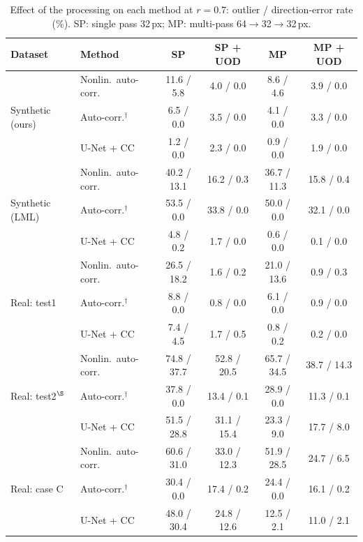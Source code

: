 \begin{table}[t]
\centering
\caption{Effect of the processing on each method at $r=0.7$: outlier / direction-error rate (\%). SP: single pass 32\,px; MP: multi-pass 64$\to$32$\to$32\,px.}
\label{tab:process}
\small
\begin{tabular}{llcccc}
\toprule
Dataset & Method & SP & SP + UOD & MP & MP + UOD \\
\midrule
\multirow{3}{*}{Synthetic (ours)} & Nonlin.\ auto-corr. & 11.6 / 5.8 & 4.0 / 0.0 & 8.6 / 4.6 & 3.9 / 0.0 \\
 & Auto-corr.$^\dagger$ & 6.5 / 0.0 & 3.5 / 0.0 & 4.1 / 0.0 & 3.3 / 0.0 \\
 & U-Net + CC & 1.2 / 0.0 & 2.3 / 0.0 & 0.9 / 0.0 & 1.9 / 0.0 \\
\midrule
\multirow{3}{*}{Synthetic (LML)} & Nonlin.\ auto-corr. & 40.2 / 13.1 & 16.2 / 0.3 & 36.7 / 11.3 & 15.8 / 0.4 \\
 & Auto-corr.$^\dagger$ & 53.5 / 0.0 & 33.8 / 0.0 & 50.0 / 0.0 & 32.1 / 0.0 \\
 & U-Net + CC & 4.8 / 0.2 & 1.7 / 0.0 & 0.6 / 0.0 & 0.1 / 0.0 \\
\midrule
\multirow{3}{*}{Real: test1} & Nonlin.\ auto-corr. & 26.5 / 18.2 & 1.6 / 0.2 & 21.0 / 13.6 & 0.9 / 0.3 \\
 & Auto-corr.$^\dagger$ & 8.8 / 0.0 & 0.8 / 0.0 & 6.1 / 0.0 & 0.9 / 0.0 \\
 & U-Net + CC & 7.4 / 4.5 & 1.7 / 0.5 & 0.8 / 0.2 & 0.2 / 0.0 \\
\midrule
\multirow{3}{*}{Real: test2$^\S$} & Nonlin.\ auto-corr. & 74.8 / 37.7 & 52.8 / 20.5 & 65.7 / 34.5 & 38.7 / 14.3 \\
 & Auto-corr.$^\dagger$ & 37.8 / 0.0 & 13.4 / 0.1 & 28.9 / 0.0 & 11.3 / 0.1 \\
 & U-Net + CC & 51.5 / 28.8 & 31.1 / 15.4 & 23.3 / 9.0 & 17.7 / 8.0 \\
\midrule
\multirow{3}{*}{Real: case C} & Nonlin.\ auto-corr. & 60.6 / 31.0 & 33.0 / 12.3 & 51.9 / 28.5 & 24.7 / 6.5 \\
 & Auto-corr.$^\dagger$ & 30.4 / 0.0 & 17.4 / 0.2 & 24.4 / 0.0 & 16.1 / 0.2 \\
 & U-Net + CC & 48.0 / 30.4 & 24.8 / 12.6 & 12.5 / 2.1 & 11.0 / 2.1 \\
\bottomrule
\end{tabular}
\end{table}
